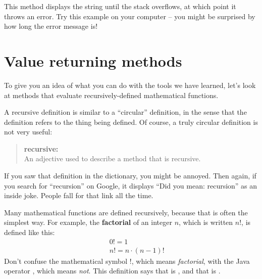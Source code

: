 
This method displays the string until the stack overflows, at which point it throws an error.
Try this example on your computer -- you might be surprised by how long the error message is!


\section{Value returning methods}
\label{factorial}

%
%

To give you an idea of what you can do with the tools we have learned, let's look at methods that evaluate recursively-defined mathematical functions.

A recursive definition is similar to a ``circular'' definition, in the sense that the definition refers to the thing being defined.
Of course, a truly circular definition is not very useful:

\begin{quote}
{\bf recursive:} \\
An adjective used to describe a method that is recursive.
\end{quote}


If you saw that definition in the dictionary, you might be annoyed.
Then again, if you search for ``recursion'' on Google, it displays ``Did you mean: recursion'' as an inside joke.
People fall for that link all the time.


Many mathematical functions are defined recursively, because that is often the simplest way.
For example, the {\bf factorial} of an integer $n$, which is written $n!$, is defined like this:
%
\begin{eqnarray*}
&&  0! = 1 \\
&&  n! = n \cdot(n-1)!
\end{eqnarray*}
%
Don't confuse the mathematical symbol $!$, which means {\em factorial}, with the Java operator \java{!}, which means {\em not}.
This definition says that  is , and that  is .

